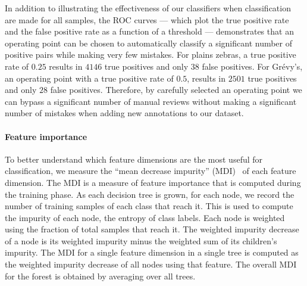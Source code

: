         In addition to illustrating the effectiveness of our classifiers when classification are made for all
          samples, the ROC curves --- which plot the true positive rate and the false positive rate as a function
          of a threshold --- demonstrates that an operating point can be chosen to automatically classify a
          significant number of positive pairs while making very few mistakes.
        For plains zebras, a true positive rate of $0.25$ results in $4146$ true positives and only $38$ false
          positives.
        For Grévy's, an operating point with a true positive rate of $0.5$, results in $2501$ true positives and
          only $28$ false positives.
        Therefore, by carefully selected an operating point we can bypass a significant number of manual reviews
          without making a significant number of mistakes when adding new annotations to our dataset.


        \PositiveHist{}

        \PositiveROC{}

        \FloatBarrier{}
        \paragraph{Feature importance}

        To better understand which feature dimensions are the most useful for classification, we measure the
          ``mean decrease impurity'' (MDI)~\cite{louppe_understanding_2014} of each feature dimension.
        The MDI is a measure of feature importance that is computed during the training phase.
        As each decision tree is grown, for each node, we record the number of training samples of each class
          that reach it.
        This is used to compute the impurity of each node, \ie{} the entropy of class labels.
        Each node is weighted using the fraction of total samples that reach it.
        The weighted impurity decrease of a node is its weighted impurity minus the weighted sum of its
          children's impurity.
        The MDI for a single feature dimension in a single tree is computed as the weighted impurity decrease of
          all nodes using that feature.
        The overall MDI for the forest is obtained by averaging over all trees.


